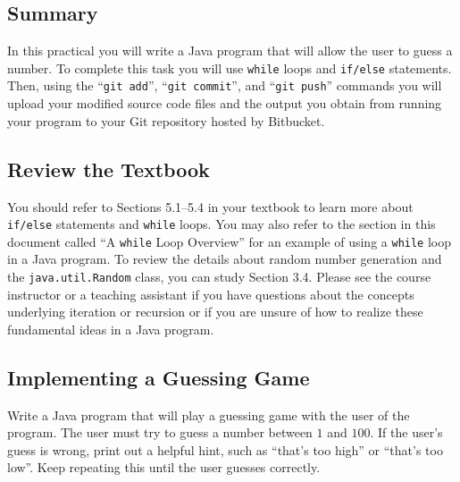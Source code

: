 



\subsection*{Summary}
\vspace*{-.05in}

In this practical you will write a Java program that will allow the user to guess a number. To complete this task you
will use {\tt while} loops and {\tt if/else} statements.  Then, using the ``{\tt git add}'', ``{\tt git  commit}'', and
``{\tt git push}'' commands you will upload your modified source code files and the output you obtain from running your
program to your Git repository hosted by Bitbucket.

\vspace*{-.1in}
\subsection*{Review the Textbook}
\vspace*{-.05in}

You should refer to Sections 5.1--5.4 in your textbook to learn more about {\tt if/else} statements and {\tt while} loops.
You may also refer to the section in this document called ``A {\tt while} Loop Overview'' for an example of using a
{\tt while} loop in a Java program. To review the details about random number generation and the {\tt java.util.Random}
class, you can study Section 3.4. Please see the course instructor or a teaching assistant if you have questions about
the concepts underlying iteration or recursion or if you are unsure of how to realize these fundamental ideas in a Java
program.

\vspace*{-.1in}
\subsection*{Implementing a Guessing Game}
\vspace*{-.05in}

Write a Java program that will play a guessing game with the user of the program.  The user must try to guess a number
between $1$ and $100$. If the user's guess is wrong, print out a helpful hint, such as ``that's too high'' or ``that's
too low''. Keep repeating this until the user guesses correctly.

